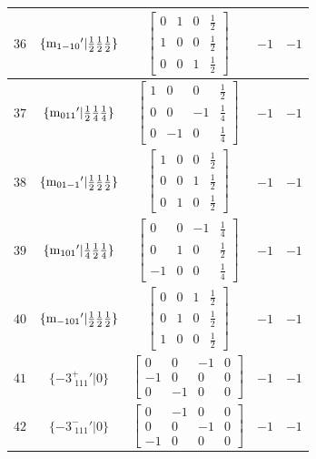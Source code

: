 \documentclass[fleqn,8pt]{jsarticle}
\begin{document}
\begin{longtable}{ccccc}
$ 36 $ & $ \{{\rm m}_{1-10}{}'|\frac{1}{2} \frac{1}{2} \frac{1}{2}\} $ & $ \begin{bmatrix} 0 & 1 & 0 & \frac{1}{2} \\ 1 & 0 & 0 & \frac{1}{2} \\ 0 & 0 & 1 & \frac{1}{2} \end{bmatrix} $ & $ -1 $ & $ -1 $ \\ \hline
$ 37 $ & $ \{{\rm m}_{011}{}'|\frac{1}{2} \frac{1}{4} \frac{1}{4}\} $ & $ \begin{bmatrix} 1 & 0 & 0 & \frac{1}{2} \\ 0 & 0 & -1 & \frac{1}{4} \\ 0 & -1 & 0 & \frac{1}{4} \end{bmatrix} $ & $ -1 $ & $ -1 $ \\ \hline
$ 38 $ & $ \{{\rm m}_{01-1}{}'|\frac{1}{2} \frac{1}{2} \frac{1}{2}\} $ & $ \begin{bmatrix} 1 & 0 & 0 & \frac{1}{2} \\ 0 & 0 & 1 & \frac{1}{2} \\ 0 & 1 & 0 & \frac{1}{2} \end{bmatrix} $ & $ -1 $ & $ -1 $ \\ \hline
$ 39 $ & $ \{{\rm m}_{101}{}'|\frac{1}{4} \frac{1}{2} \frac{1}{4}\} $ & $ \begin{bmatrix} 0 & 0 & -1 & \frac{1}{4} \\ 0 & 1 & 0 & \frac{1}{2} \\ -1 & 0 & 0 & \frac{1}{4} \end{bmatrix} $ & $ -1 $ & $ -1 $ \\ \hline
$ 40 $ & $ \{{\rm m}_{-101}{}'|\frac{1}{2} \frac{1}{2} \frac{1}{2}\} $ & $ \begin{bmatrix} 0 & 0 & 1 & \frac{1}{2} \\ 0 & 1 & 0 & \frac{1}{2} \\ 1 & 0 & 0 & \frac{1}{2} \end{bmatrix} $ & $ -1 $ & $ -1 $ \\ \hline
$ 41 $ & $ \{-3^{+}_{\,\,111}{}'|0\} $ & $ \begin{bmatrix} 0 & 0 & -1 & 0 \\ -1 & 0 & 0 & 0 \\ 0 & -1 & 0 & 0 \end{bmatrix} $ & $ -1 $ & $ -1 $ \\ \hline
$ 42 $ & $ \{-3^{-}_{\,\,111}{}'|0\} $ & $ \begin{bmatrix} 0 & -1 & 0 & 0 \\ 0 & 0 & -1 & 0 \\ -1 & 0 & 0 & 0 \end{bmatrix} $ & $ -1 $ & $ -1 $ \\ \hline

\end{longtable}
\end{document}
